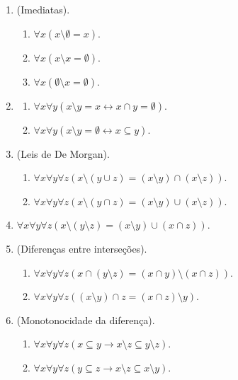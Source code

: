 \begin{proposition}
    \leavevmode
        \begin{enumerate}[leftmargin=*, align=left, label=\textbf{(\alph*)}]
            \item (Imediatas).
                \begin{enumerate}[label=\roman*.]
                    \item $\forall x (x \setminus \emptyset = x)$.
                    \item $\forall x (x \setminus x = \emptyset)$.
                    \item $\forall x (\emptyset \setminus x = \emptyset)$.
                \end{enumerate}
            \item \leavevmode
                \begin{enumerate}[label=\roman*.]
                    \item $\forall x \forall y (x \setminus y = x \leftrightarrow x \cap y = \emptyset)$.
                    \item $\forall x \forall y (x \setminus y = \emptyset \leftrightarrow x \subseteq y)$.
                \end{enumerate}
            \item (Leis de De Morgan).
                \begin{enumerate}[label=\roman*.]
                    \item $\forall x \forall y \forall z ( x \setminus (y \cup z) = (x \setminus y) \cap (x \setminus z) )$.
                    \item $\forall x \forall y \forall z ( x \setminus (y \cap z) = (x \setminus y) \cup (x \setminus z) )$.
                \end{enumerate}
            \item $\forall x \forall y \forall z ( x \setminus (y \setminus z) = (x \setminus y) \cup (x \cap z) )$.
            \item (Diferenças entre interseções).
                \begin{enumerate}[label=\roman*.]
                    \item $\forall x \forall y \forall z ( x \cap (y \setminus z) = (x \cap y) \setminus (x \cap z) )$.
                    \item $\forall x \forall y \forall z ( (x \setminus y) \cap z = (x \cap z) \setminus y )$.
                \end{enumerate}
            \item (Monotonocidade da diferença).
                \begin{enumerate}[label=\roman*.]
                    \item $\forall x \forall y \forall z (x \subseteq y \rightarrow x \setminus z \subseteq y \setminus z)$.
                    \item $\forall x \forall y \forall z (y \subseteq z \rightarrow x \setminus z \subseteq x \setminus y)$.
                \end{enumerate}
        \end{enumerate}
\end{proposition}

